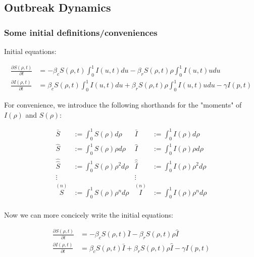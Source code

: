 \documentclass{article}
\begin{document}


\subsection{Outbreak Dynamics}

\subsubsection{Some initial definitions/conveniences}

Initial equations:


\begin{align*}
\frac{\partial S(\rho, t)}{\partial t} &=
	-\beta_c S(\rho, t) \int_{0}^1 I(u, t) du
	-\beta_r S(\rho, t) \rho \int_{0}^1 I(u, t) u du\\
\frac{\partial I(\rho, t)}{\partial t} &=
	\beta_c S(\rho, t) \int_{0}^1 I(u, t) du
	+ \beta_r S(\rho, t) \rho \int_{0}^1 I(u, t) u du - \gamma I(p, t)
\end{align*}


For convenience, we introduce the following shorthands 
for the "moments" of $I(\rho)$ and $S(\rho)$:


\begin{align*}
\bar S &:= \int_{0}^{1} S(\rho) d\rho
	& \bar I &:= \int_{0}^{1} I(\rho) d\rho\\
\hat S &:= \int_{0}^{1} S(\rho) \rho d\rho
	& \hat I &:= \int_{0}^{1} I(\rho) \rho d\rho\\
\hat{\hat{ S}} &:= \int_{0}^{1} S(\rho) \rho^2 d\rho
	& \hat{\hat{ I}} &:= \int_{0}^{1} I(\rho) \rho^2 d\rho\\
\vdots & & \vdots \\
\overset{(n)}{S} &:= \int_{0}^{1} S(\rho) \rho^n d\rho
	& \overset{(n)}{I} &:= \int_{0}^{1} I(\rho) \rho^n d\rho\\
\end{align*}


Now we can more concicely write the initial equations:


\begin{align*}
\frac{\partial S(\rho, t)}{\partial t} &=
	-\beta_c S(\rho, t) \bar I
	-\beta_r S(\rho, t) \rho \hat I\\
\frac{\partial I(\rho, t)}{\partial t} &=
	\beta_c S(\rho, t) \bar I
	+ \beta_r S(\rho, t) \rho \hat I - \gamma I(p, t)
\end{align*}
\end{document}
